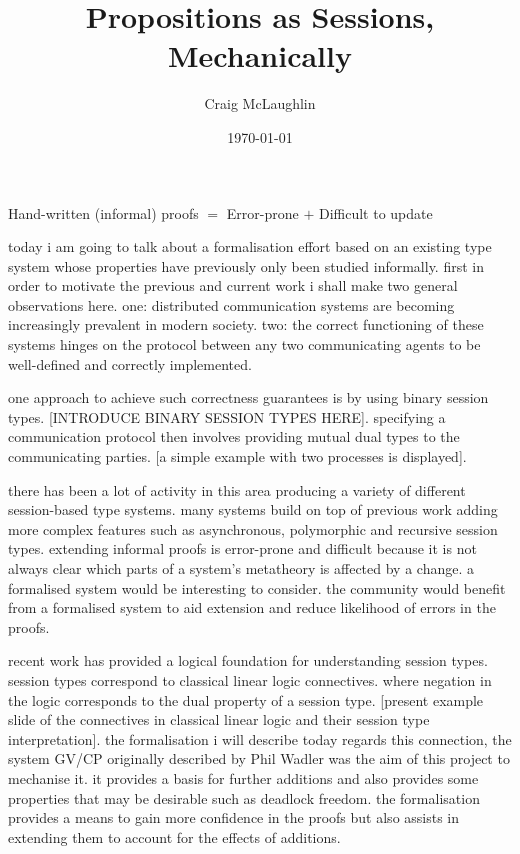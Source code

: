 \documentclass{beamer}
\title[Project Presentation]{Propositions as Sessions, Mechanically}
\author{Craig McLaughlin}
\institute{University Of Glasgow}
\date{\today}
\begin{document}
\begin{frame}
\titlepage
\end{frame}

\begin{frame}
Hand-written (informal) proofs $=$ Error-prone $+$ Difficult to update
\end{frame}

today i am going to talk about a formalisation effort based on an existing
type system whose properties have previously only been studied
informally. first in order to motivate the previous and current work i shall
make two general observations here. one: distributed communication systems are
becoming increasingly prevalent in modern society. two: the correct
functioning of these systems hinges on the protocol between any two
communicating agents to be well-defined and correctly implemented.

one approach to achieve such correctness guarantees is by using binary session
types. [INTRODUCE BINARY SESSION TYPES HERE]. specifying a communication
protocol then involves providing mutual dual types to the communicating
parties. [a simple example with two processes is displayed].

there has been a lot of activity in this area producing a variety of different
session-based type systems. many systems build on top of previous work adding
more complex features such as asynchronous, polymorphic and recursive session
types. extending informal proofs is error-prone and difficult because it is
not always clear which parts of a system's metatheory is affected by a
change. a formalised system would be interesting to consider. the community
would benefit from a formalised system to aid extension and reduce likelihood
of errors in the proofs.

recent work has provided a logical foundation for understanding session
types. session types correspond to classical linear logic connectives. where
negation in the logic corresponds to the dual property of a session
type. [present example slide of the connectives in classical linear logic and
  their session type interpretation]. the formalisation i will describe today
regards this connection, the system GV/CP originally described by Phil Wadler
was the aim of this project to mechanise it. it provides a basis for further
additions and also provides some properties that may be desirable such as
deadlock freedom. the formalisation provides a means to gain more confidence
in the proofs but also assists in extending them to account for the effects of
additions.
\end{document}
